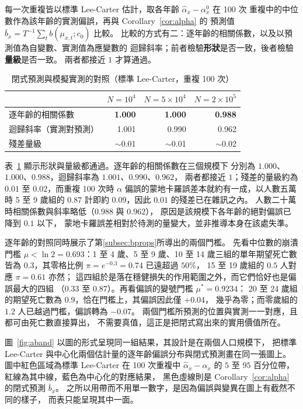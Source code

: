 \documentclass[UTF8, fontset=macnew, a4paper, 12pt]{ctexart}
\begin{document}
每一次重複皆以標準 Lee-Carter 估計，取各年齡 $\hat\alpha_x-\alpha^{0}_x$ 在 100 次
重複中的中位數作為該年齡的實測偏誤，再與 Corollary~\ref{cor:alpha} 的
預測值 $\bar b_x=T^{-1}\sum_t b(\mu_{x,t};c_0)$ 比較。
比較的方式有二：逐年齡的相關係數，以及以預測值為自變數、實測值為應變數的
迴歸斜率；前者檢驗\textbf{形狀}是否一致，後者檢驗\textbf{量級}是否一致。
兩者都接近 $1$ 才算通過。


\begin{table}[H]
\centering
\caption{閉式預測與模擬實測的對照（標準 Lee-Carter，重複 100 次）}
\footnotesize
\begin{tabular}{lrrr}
\toprule
 & $N=10^4$ & $N=5\times10^4$ & $N=2\times10^5$\\
\midrule
逐年齡的相關係數 & \textbf{1.000} & \textbf{1.000} & \textbf{0.988}\\
迴歸斜率（實測對預測） & 1.001 & 0.990 & 0.962\\
殘差量級 & $\sim$0.01 & $\sim$0.01 & $\sim$0.02\\
\bottomrule
\end{tabular}
\label{tab:valid}
\end{table}

表~\ref{tab:valid} 顯示形狀與量級都通過。逐年齡的相關係數在三個規模下
分別為 $1.000$、$1.000$、$0.988$，迴歸斜率為 $1.001$、$0.990$、$0.962$，
兩者都接近 $1$；殘差的量級約為 $0.01$ 至 $0.02$，而重複 100 次時
$\alpha$ 偏誤的蒙地卡羅誤差本就約有一成，以人數五萬時 5 至 9 歲組的
$0.87$ 計即約 $0.09$，因此 $0.01$ 的殘差已在雜訊之內。
人數二十萬時相關係數與斜率略低（$0.988$ 與 $0.962$），
原因是該規模下各年齡的絕對偏誤已降到 $0.1$ 以下，
蒙地卡羅誤差相對於待測的量變大，並非推導本身在該處失準。

逐年齡的對照同時展示了第\ref{subsec:bprops}所導出的兩個門檻。
先看中位數的崩潰門檻
$\mu<\ln2=0.693$：1 至 4 歲、5 至 9 歲、10 至 14 歲三組的單年期望死亡數
皆為 $0.3$，其零格比例 $\pi=e^{-0.3}=0.74$ 已遠超過 $50\%$，
15 至 19 歲組的 $0.5$ 人對應 $\pi=0.61$ 亦然；
這四組於是落在穩健損失的作用範圍之外，而它們恰好也是偏誤最大的四組
（$0.33$ 至 $0.87$）。再看偏誤的變號門檻 $\mu^\ast=0.9234$：
20 至 24 歲組的期望死亡數為 $0.9$，恰在門檻上，其偏誤因此僅 $+0.04$，
幾乎為零；而零歲組的 $1.2$ 人已越過門檻，偏誤轉為 $-0.07$。
兩個門檻所預測的位置與實測一一對應，且都可由死亡數直接算出，
不需要真值，這正是把閉式寫出來的實用價值所在。

圖~\ref{fig:aband} 以圖的形式呈現同一組結果，其設計是在兩個人口規模下，
把標準 Lee-Carter 與中心化兩個估計量的逐年齡偏誤分布與閉式預測畫在同一張圖上。
圖中紅色區域為標準 Lee-Carter 在 100 次重複中 $\hat\alpha_x-\alpha_x$ 的
$5$ 至 $95$ 百分位帶，紅線為其中線，藍色為中心化的對應結果，
黑色虛線則是 Corollary~\ref{cor:alpha} 的閉式預測 $\bar b_x$。
之所以用帶而不用單一數字，是因為偏誤與變異在圖上有截然不同的樣子，
而表只能呈現其中一面。
\end{document}

